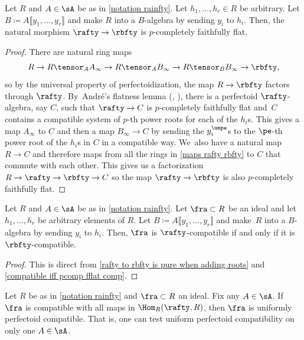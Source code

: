 \begin{lemma}\label{rafty to rbfty is pure when adding roots}
Let $R$ and $A\in \sA$ be as in \autoref{notation rainfty}. Let $h_1,\ldots,h_r\in R$ be arbitrary. Let $B\coloneqq A\llbracket y_1,\ldots,y_r \rrbracket$ and make $R$ into a $B$-algebra by sending $y_i$ to $h_i$. Then, the natural morphism $\rafty\to \rbfty$ is $p$-completely faithfully flat.
\end{lemma}

\begin{proof}
There are natural ring maps
\begin{equation}\label{maps rafty rbfty}
R \to R\tensor_A A_\infty \to R\tensor_A B_\infty \to R\tensor_B B_\infty \to \rbfty,
\end{equation}
so by the universal property of perfectoidization, the map $R\to \rbfty$ factors through $\rafty$. By~André's flatness lemma (\cite[Th.\,2.5.1]{AndreConjectureFacteurDirect}, \cite[Th.\,7.14]{BhattScholzePrisms}), there is a perfectoid $\rafty$-algebra, say $C$, such that $\rafty\to C$ is $p$-completely faithfully flat and~$C$ contains a compatible system of $p$-th power roots for each of the $h_i$s. This gives a map $A_\infty$ to $C$ and then a map $B_\infty \to C$ by sending the $y_i^{\unpe}$s to the $\pe$-th power root of the $h_i$s in $C$ in a compatible way. We~also have a natural map $R\to C$ and therefore maps from all the rings in \autoref{maps rafty rbfty} to $C$ that commute with each other. This gives us a factorization $R\to \rafty \to \rbfty \to C$ so the map $\rafty \to \rbfty$ is also $p$-completely faithfully flat.
\end{proof}

\begin{proposition}\label{compatible with rafty iff compatible with rbfty}
Let $R$ and $A\in \sA$ be as in \autoref{notation rainfty}. Let $\fra\subset R$ be an ideal and let $h_1,\ldots,h_r$ be arbitrary elements of $R$. Let $B\coloneqq A\llbracket y_1,\ldots,y_r \rrbracket$ and make~$R$ into a $B$-algebra by sending $y_i$ to $h_i$. Then, $\fra$ is $\rafty$-compatible if and only if it is $\rbfty$-compatible.
\end{proposition}

\begin{proof}
This is direct from \autoref{rafty to rbfty is pure when adding roots} and \autoref{compatible iff pcomp fflat comp}.
\end{proof}

\begin{corollary}\label{uniformly compatible doesn't depend on the choice of A}
Let $R$ be as in \autoref{notation rainfty} and $\fra\subset R$ an ideal. Fix any $A\in \sA$. If~$\fra$ is compatible with all maps in $\Hom_R(\rafty,R)$, then $\fra$ is uniformly perfectoid compatible. That is, one can test uniform perfectoid compatibility on only one $A\in \sA$.
\end{corollary}

